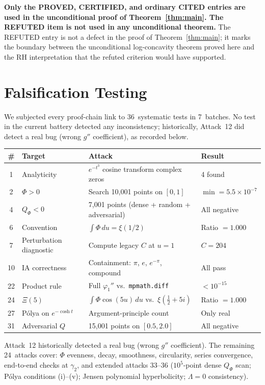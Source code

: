 \documentclass[11pt]{article}
\theoremstyle{definition}
\theoremstyle{remark}
\begin{document}
\medskip
\noindent\textbf{Only the PROVED, CERTIFIED, and ordinary CITED entries are used in the
unconditional proof of Theorem~\ref{thm:main}.
The REFUTED item is not used in any unconditional theorem.}
The REFUTED entry is not a defect in the proof of Theorem~\ref{thm:main};
it marks the boundary between the unconditional log-concavity theorem proved here
and the RH interpretation that the refuted criterion would have supported.

\section{Falsification Testing}
\label{sec:falsify}

We subjected every proof-chain link to 36~systematic tests in 7~batches.
No test in the current battery detected any inconsistency; historically,
Attack~12 did detect a real bug (wrong $g''$ coefficient), as recorded below.

\begin{center}
\small
\begin{tabular}{clp{5.8cm}l}
\toprule
\# & Target & Attack & Result \\
\midrule
1 & Analyticity & $e^{-t^3}$ cosine transform complex zeros & 4 found \\
2 & $\Phi > 0$ & Search 10{,}001 points on $[0,1]$ & $\min = 5.5 \times 10^{-7}$ \\
4 & $Q_\Phi < 0$ & 7{,}001 points (dense + random + adversarial) & All negative \\
6 & Convention & $\int\Phi\,du = \xi(1/2)$ & Ratio $= 1.000$ \\
7 & Perturbation diagnostic & Compute legacy $C$ at $u = 1$ & $C = 204$ \\
10 & IA correctness & Containment: $\pi$, $e$, $e^{-\pi}$, compound & All pass \\
22 & Product rule & Full $\varphi_1''$ vs.\ \texttt{mpmath.diff} & $< 10^{-15}$ \\
24 & $\Xi(5)$ & $\int\Phi\cos(5u)\,du$ vs.\ $\xi(\tfrac{1}{2}+5i)$ & Ratio $= 1.000$ \\
27 & P\'{o}lya on $e^{-\cosh t}$ & Argument-principle count & Only real \\
31 & Adversarial $Q$ & 15{,}001 points on $[0.5, 2.0]$ & All negative \\
\bottomrule
\end{tabular}
\end{center}
\noindent Attack~12 historically detected a real bug (wrong $g''$ coefficient).
The remaining 24~attacks cover: $\Phi$ evenness, decay, smoothness, circularity,
series convergence, end-to-end checks at $\gamma_2$, and extended attacks 33--36
($10^5$-point dense $Q_\Phi$ scan; P\'{o}lya conditions (i)--(v); Jensen
polynomial hyperbolicity; $\Lambda = 0$ consistency).
\end{document}
